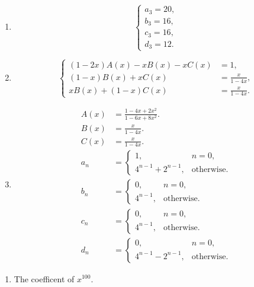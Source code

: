 \documentclass{../../cls/sig-alternate-05-2015}
\begin{document}
\begin{enumerate}
\begin{enumerate}
        \item \begin{equation}
            \begin{cases}
            a_3 = 20,\\
            b_3 = 16,\\
            c_3 = 16,\\
            d_3 = 12.
            \end{cases}
        \end{equation}
        
        \item \begin{equation}
            \begin{cases}
            (1 - 2x)A(x) - x B(x) - x C(x) & = 1,\\
            (1 - x) B(x) + x C(x) & = \frac{x}{1 - 4x},\\
            x B(x) + (1 - x) C(x) & = \frac{x}{1 - 4x}.
            \end{cases}
        \end{equation}
        
        \item \begin{align}
            A(x) & = \frac{1 - 4x + 2x^2}{1 - 6x + 8x^2}.\\
            B(x) & = \frac{x}{1 - 4x}.\\
            C(x) & = \frac{x}{1 - 4x}.\\
            a_n & = \begin{cases}
                1, & n = 0,\\
                4^{n-1} + 2^{n - 1}, & \text{otherwise}.
            \end{cases}\\
            b_n & = \begin{cases}
                0, & n = 0,\\
                4^{n - 1}, & \text{otherwise}.
            \end{cases}\\
            c_n & = \begin{cases}
                0, & n = 0,\\
                4^{n - 1}, & \text{otherwise}.
            \end{cases}\\
            d_n & = \begin{cases}
                0, & n = 0,\\
                4^{n - 1} - 2^{n - 1}, & \text{otherwise}.
            \end{cases}
        \end{align}
    \end{enumerate}
    \begin{enumerate}
        \item The coefficent of $x^{100}$.
        

\end{enumerate}
\end{enumerate}
\end{document}
